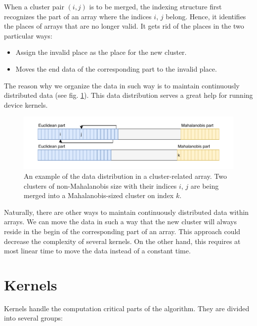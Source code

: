 When a cluster pair $(i,j)$ is to be merged, the indexing structure first recognizes the part of an array where the indices $i$, $j$ belong. Hence, it identifies the places of arrays that are no longer valid. It gets rid of the places in the two particular ways:
\begin{itemize}
	\item Assign the invalid place as the place for the new cluster.
	\item Moves the end data of the corresponding part to the invalid place.
\end{itemize}
The reason why we organize the data in such way is to maintain continuously distributed data (see fig. \ref{fig03:data_order}). This data distribution serves a great help for running device kernels.

\begin{figure}\centering
	\includegraphics[width=\textwidth]{img/data}
	\caption{An example of the data distribution in a cluster-related array. Two clusters of non-Mahalanobis size with their indices $i$, $j$ are being merged into a Mahalanobis-sized cluster on index $k$.}
	\label{fig03:data_order}
\end{figure}

\begin{rem}
	Naturally, there are other ways to maintain continuously distributed data within arrays. We can move the data in such a way that the new cluster will always reside in the begin of the corresponding part of an array. This approach could decrease the complexity of several kernels. On the other hand, this requires at most linear time to move the data instead of a constant time.
\end{rem}

\section{Kernels}

Kernels handle the computation critical parts of the algorithm. They are divided into several groups:

